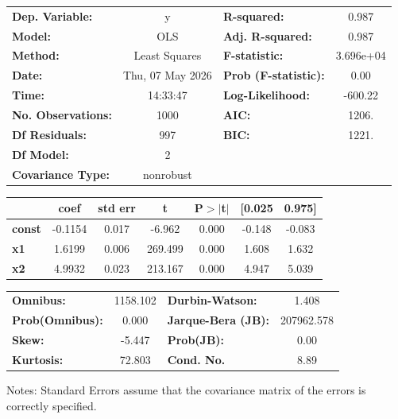 \begin{center}
\begin{tabular}{lclc}
\toprule
\textbf{Dep. Variable:}    &        y         & \textbf{  R-squared:         } &     0.987   \\
\textbf{Model:}            &       OLS        & \textbf{  Adj. R-squared:    } &     0.987   \\
\textbf{Method:}           &  Least Squares   & \textbf{  F-statistic:       } & 3.696e+04   \\
\textbf{Date:}             & Thu, 07 May 2026 & \textbf{  Prob (F-statistic):} &     0.00    \\
\textbf{Time:}             &     14:33:47     & \textbf{  Log-Likelihood:    } &   -600.22   \\
\textbf{No. Observations:} &        1000      & \textbf{  AIC:               } &     1206.   \\
\textbf{Df Residuals:}     &         997      & \textbf{  BIC:               } &     1221.   \\
\textbf{Df Model:}         &           2      & \textbf{                     } &             \\
\textbf{Covariance Type:}  &    nonrobust     & \textbf{                     } &             \\
\bottomrule
\end{tabular}
\begin{tabular}{lcccccc}
               & \textbf{coef} & \textbf{std err} & \textbf{t} & \textbf{P$> |$t$|$} & \textbf{[0.025} & \textbf{0.975]}  \\
\midrule
\textbf{const} &      -0.1154  &        0.017     &    -6.962  &         0.000        &       -0.148    &       -0.083     \\
\textbf{x1}    &       1.6199  &        0.006     &   269.499  &         0.000        &        1.608    &        1.632     \\
\textbf{x2}    &       4.9932  &        0.023     &   213.167  &         0.000        &        4.947    &        5.039     \\
\bottomrule
\end{tabular}
\begin{tabular}{lclc}
\textbf{Omnibus:}       & 1158.102 & \textbf{  Durbin-Watson:     } &     1.408   \\
\textbf{Prob(Omnibus):} &   0.000  & \textbf{  Jarque-Bera (JB):  } & 207962.578  \\
\textbf{Skew:}          &  -5.447  & \textbf{  Prob(JB):          } &      0.00   \\
\textbf{Kurtosis:}      &  72.803  & \textbf{  Cond. No.          } &      8.89   \\
\bottomrule
\end{tabular}
\end{center}

Notes: \newline
 [1] Standard Errors assume that the covariance matrix of the errors is correctly specified.